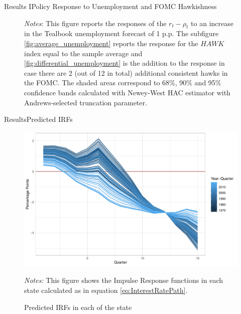 \documentclass[11pt,pdf,aspectratio=129]{beamer}
\begin{document}
\begin{frame}{Results I}{Policy Response to Unemployment and FOMC Hawkishness}
\begin{figure}[!htbp]
\begin{subfigure}[b]{0.49\textwidth}
        \end{subfigure}\vspace{-4ex}
            {\begin{flushleft}\tiny\textit{Notes}: This figure reports the responses of the $r_t-\rho_t$ to an increase in the Tealbook unemployment forecast of 1 p.p. The subfigure \ref{fig:average_unemployment} reports the response for the $\mathit{HAWK}$ index equal to the sample average and \ref{fig:differential_unemployment} is the addition to the response in case there are 2 (out of 12 in total) additional consistent hawks in the FOMC. The shaded areas correspond to 68\%, 90\% and 95\% confidence bands calculated with Newey-West HAC estimator with Andrews-selected truncation parameter.\end{flushleft}}
    \end{figure}
    
\end{frame}



\begin{frame}{Results}{Predicted IRFs}
    \begin{figure}[!htbp]\centering
        \begin{minipage}{0.7\textwidth}
          \caption{Predicted IRFs in each of the state} 
          \label{fig:predicted_IRF}
          \includegraphics[width=\linewidth]{irfs_plot.pdf}
          {\begin{flushleft}\tiny \textit{Notes:} This figure shows the Impulse Response functions in each state calculated as in equation \eqref{eq:InterestRatePath}.\end{flushleft}} 
          \end{minipage}
      \end{figure}
\end{frame}
\end{document}
